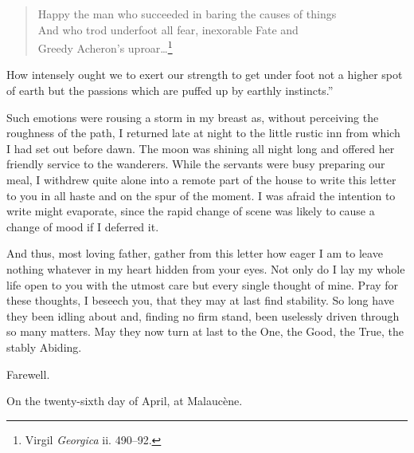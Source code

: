\begin{verse} Happy the man who succeeded in baring the causes of
things\\ And who trod underfoot all fear, inexorable Fate and\\ Greedy
Acheron's uproar\ldots\footnote{Virgil \textit{Georgica} ii. 490--92.}
\end{verse}

\noindent How intensely ought we to exert our strength to get under
foot not a higher spot of earth but the passions which are puffed up
by earthly instincts.''

Such emotions were rousing a storm in my breast as, without perceiving
the roughness of the path, I returned late at night to the little
rustic inn from which I had set out before dawn. The moon was shining
all night long and offered her friendly service to the wanderers.
While the servants were busy preparing our meal, I withdrew quite
alone into a remote part of the house to write this letter to you in
all haste and on the spur of the moment. I was afraid the intention to
write might evaporate, since the rapid change of scene was likely to
cause a change of mood if I deferred it.

And thus, most loving father, gather from this letter how eager I am
to leave nothing whatever in my heart hidden from your eyes. Not only
do I lay my whole life open to you with the utmost care but every
single thought of mine. Pray for these thoughts, I beseech you, that
they may at last find stability. So long have they been idling about
and, finding no firm stand, been uselessly driven through so many
matters. May they now turn at last to the One, the Good, the True, the
stably Abiding.

Farewell.

On the twenty-sixth day of April, at Malauc\`{e}ne.

